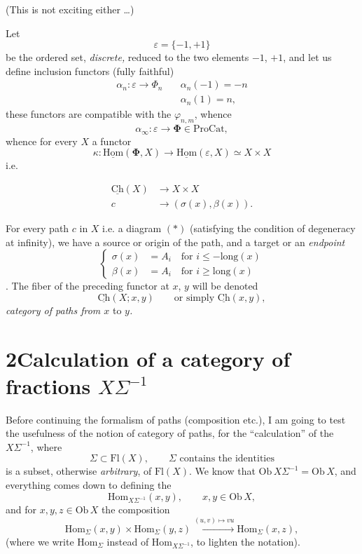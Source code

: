 \documentclass[11pt]{article}
\newcommand{\printedpage}[1]{\marginpar{\footnotesize p.~#1}}
\newcommand{\msp}[1]{\marginpar{\footnotesize [#1]}}
\newcommand{\uCh}{\underline{\mathrm{Ch}}}
\newcommand{\uHom}{\underline{\mathrm{Hom}}}
\newcommand{\Hom}{\mathrm{Hom}}
\begin{document}
\printedpage{4}

(This is not exciting either \dots)

Let
\[
\varepsilon=\{-1,+1\}
\]
be the ordered set, \textit{discrete,} reduced to the two elements $-1$, $+1$, and let us define inclusion functors (fully faithful)
\[
\begin{aligned}
\alpha_n:\varepsilon\longrightarrow\Phi_n\quad & \alpha_n(-1)=-n\\
& \alpha_n(1)=n,
\end{aligned}
\]
these functors are compatible with the $\varphi_{n,m}$, whence %
\[
\alpha_\infty:\varepsilon\longrightarrow\boldsymbol{\Phi}\in\mathrm{ProCat},
\]
whence for every $X$ a functor
\[
\kappa:\uHom(\boldsymbol{\Phi},X)\longrightarrow\uHom(\varepsilon,X)\simeq X\times X
\]
i.e.

\msp{page 5}
\[
\begin{aligned}
\uCh(X) &\longrightarrow X\times X\\
c &\longrightarrow (\sigma(x),\beta(x)).
\end{aligned}
\]

 For every path $c$ in $X$ i.e. a diagram $(*)$ (satisfying the condition of degeneracy at infinity), we have a source or origin of the path, and a target or an \textit{endpoint}
\[
\left\{
\begin{aligned}
\sigma(x) &= A_i\quad\text{for } i\leq -\mathrm{long}(x)\\
\beta(x) &= A_i\quad\text{for } i\geq \mathrm{long}(x)
\end{aligned}
\right.
\]
. The fiber of the preceding functor at $x$, $y$ will be denoted
\[
\uCh(X;x,y)\qquad\text{or simply }\uCh(x,y),
\]
\textit{category of paths from $x$} to \textit{$y$.}

\printedpage{5}

\section*{2\quad Calculation of a category of fractions $X\Sigma^{-1}$}

Before continuing the formalism of paths (composition etc.), I am going to test the usefulness of the notion of category of paths, for the ``calculation'' of the $X\Sigma^{-1}$, where
\[
\Sigma\subset\mathrm{Fl}(X),\qquad\Sigma\text{ contains the identities}
\]
is a subset, otherwise \textit{arbitrary}, of $\mathrm{Fl}(X)$. We know that $\mathrm{Ob}\,X\Sigma^{-1}=\mathrm{Ob}\,X$, and everything comes down to defining the
\[
\Hom_{X\Sigma^{-1}}(x,y),\qquad x,y\in\mathrm{Ob}\,X,
\]
\msp{page 6}
and for $x,y,z\in\mathrm{Ob}\,X$ the composition
\[
\Hom_\Sigma(x,y)\times\Hom_\Sigma(y,z)\xrightarrow{(u,v)\mapsto vu}\Hom_\Sigma(x,z),
\]
(where we write $\Hom_\Sigma$ instead of $\Hom_{X\Sigma^{-1}}$, to lighten the notation).
\end{document}
